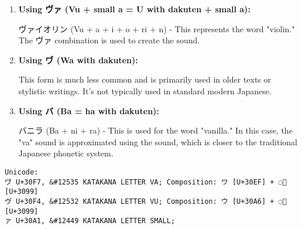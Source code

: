 \begin{enumerate}

    \item \textbf{ Using ヴァ (Vu + small a = U with dakuten + small a):}

     ヴァイオリン (Vu + a + i + o + ri + n) - This represents the word
     "violin." The ヴァ combination is used to create the  sound.

    \item \textbf{Using ヷ (Wa with dakuten):}

    This form is much less common and is primarily used in older texts or
    stylistic writings. It's not typically used in standard modern Japanese.

    \item \textbf{Using バ (Ba = ha with dakuten):}

    バニラ (Ba + ni + ra) - This is used for the word "vanilla." In this case,
    the "va" sound is approximated using the  sound, which is closer
    to the traditional Japanese phonetic system.

\end{enumerate}

\footnotesize
\begin{verbatim}
Unicode:
ヷ U+30F7, &#12535 KATAKANA LETTER VA; Composition: ワ [U+30EF] + ◌゙ [U+3099]
ヴ U+30F4, &#12532 KATAKANA LETTER VU; Composition: ウ [U+30A6] + ◌゙ [U+3099]
ァ U+30A1, &#12449 KATAKANA LETTER SMALL;
\end{verbatim}

